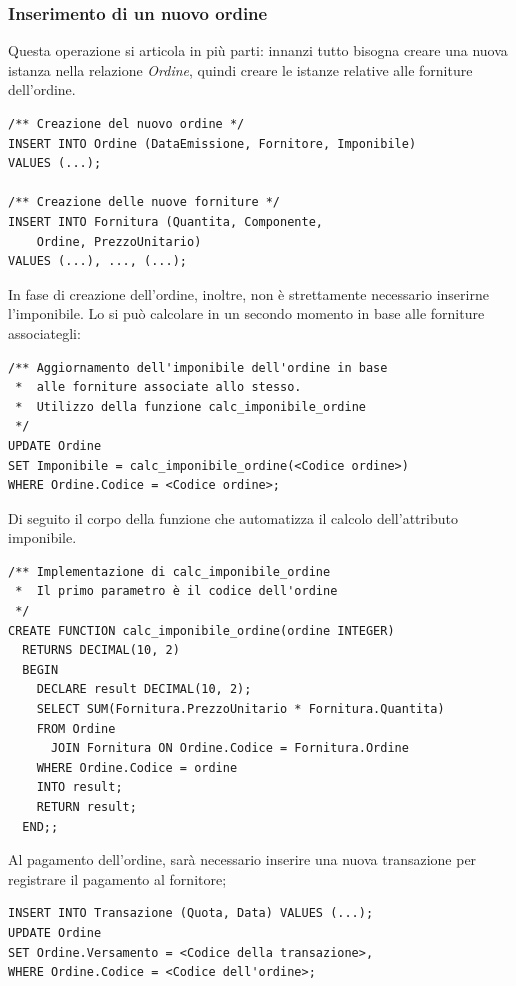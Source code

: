 			\subsubsection{Inserimento di un nuovo ordine}
				Questa operazione si articola in più parti: innanzi tutto bisogna creare una nuova istanza nella relazione \emph{Ordine}, quindi creare le istanze relative alle forniture dell'ordine.

				\begin{lstlisting}
/** Creazione del nuovo ordine */
INSERT INTO Ordine (DataEmissione, Fornitore, Imponibile) 
VALUES (...);

/** Creazione delle nuove forniture */
INSERT INTO Fornitura (Quantita, Componente, 
	Ordine, PrezzoUnitario)
VALUES (...), ..., (...);
				\end{lstlisting}

				In fase di creazione dell'ordine, inoltre, non è strettamente necessario inserirne l'imponibile. Lo si può calcolare in un secondo momento in base alle forniture associategli:

				\begin{lstlisting}
/** Aggiornamento dell'imponibile dell'ordine in base
 *  alle forniture associate allo stesso.
 *  Utilizzo della funzione calc_imponibile_ordine
 */
UPDATE Ordine
SET Imponibile = calc_imponibile_ordine(<Codice ordine>)
WHERE Ordine.Codice = <Codice ordine>;
				\end{lstlisting}

				Di seguito il corpo della funzione che automatizza il calcolo dell'attributo imponibile.

				\begin{lstlisting}
/** Implementazione di calc_imponibile_ordine
 *  Il primo parametro è il codice dell'ordine 
 */
CREATE FUNCTION calc_imponibile_ordine(ordine INTEGER)
  RETURNS DECIMAL(10, 2)
  BEGIN
    DECLARE result DECIMAL(10, 2);
    SELECT SUM(Fornitura.PrezzoUnitario * Fornitura.Quantita)
    FROM Ordine
      JOIN Fornitura ON Ordine.Codice = Fornitura.Ordine
    WHERE Ordine.Codice = ordine
    INTO result;
    RETURN result;
  END;;
				\end{lstlisting}

				Al pagamento dell'ordine, sarà necessario inserire una nuova transazione per registrare il pagamento al fornitore;

				\begin{lstlisting}
INSERT INTO Transazione (Quota, Data) VALUES (...);
UPDATE Ordine
SET Ordine.Versamento = <Codice della transazione>,
WHERE Ordine.Codice = <Codice dell'ordine>;
				\end{lstlisting}

